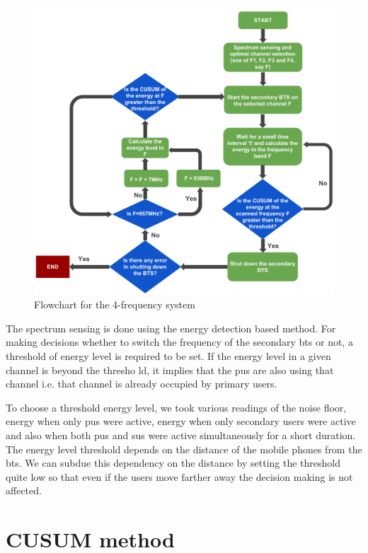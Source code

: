 \begin{figure}
\centering
\includegraphics[width=1\textwidth]{../images/freqSys4}
\caption[4-frequency system]{Flowchart for  the 4-frequency system}
\label{freqSys4}
\end{figure}

The spectrum sensing is done using the energy detection based method. For 
making decisions whether to switch the frequency of the secondary \gls{bts} or not, 
a threshold of energy level is required to be set. If the energy level in a 
given channel is beyond the thresho ld, it implies that the \glspl{pu} are
also using that channel i.e. that channel is already occupied by primary 
users.

To choose a threshold energy level, we took various readings of the noise 
floor, energy when only \glspl{pu} were active, energy when only secondary 
users were active and also when both \glspl{pu} and \glspl{su} were 
active simultaneously for a short duration. The energy level threshold depends
on the distance of the mobile phones from the \gls{bts}. We can subdue this 
dependency on the distance by setting the threshold quite low so that even if
the users move farther away the decision making is not affected.

\section{CUSUM method}

